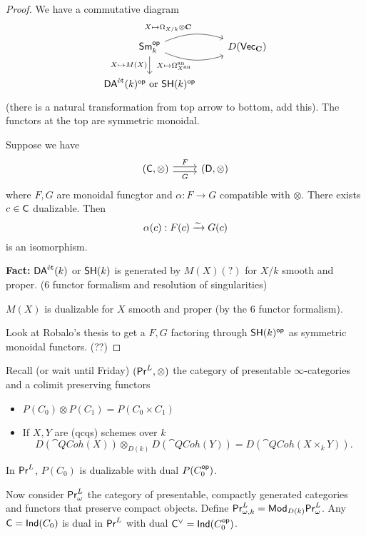 \begin{proof}
	We have a commutative diagram
	\[
		\begin{tikzcd}
			\cat{Sm}_k\op \ar[r, bend left=20, "X\mapsto \Omega_{X /k}\otimes\bb{C}", name=F]
			\ar[r, bend right=20, "X\mapsto \Omega_{X\an}\an"', name=G]
			\ar[d,"X\mapsto M(X)"']
			& D(\cat{Vec}_{\bb{C}})
			\\
			\DAet(k)\op\text{ or }\SH(k)\op
		\end{tikzcd}
	\]
	(there is a natural transformation from top arrow to bottom, add this). The functors at
	the top are symmetric monoidal.

	\begin{lemma}
		Suppose we have
		\begin{equation}
			\begin{tikzcd}
				(\C,\otimes) \ar[r,shift left,"F"] \ar[r,shift right,"G"'] & (\cat{D},\otimes)
			\end{tikzcd}
		\end{equation}
		where $F,G$ are monoidal funcgtor and $\alpha:F\to G$ compatible with $\otimes$. There
		exists $c\in \mathsf{C}$ dualizable. Then
		\[
			\alpha(c): F(c) \xrightarrow{\sim} G(c)
		\]
		is an isomorphism.
	\end{lemma}
	\textbf{Fact:} $\mathsf{DA}^\text{\'et}(k)$ or $\mathsf{SH}(k)$ is generated by $M(X)(?)$ for $X /k$ smooth and
	proper. (6 functor formalism and resolution of singularities)

	$M(X)$ is dualizable for $X$ smooth and proper (by the 6 functor formalism).

	Look at Robalo's thesis to get a $F,G$ factoring through $\mathsf{SH}(k)^\mathsf{op}$ as symmetric
	monoidal functors. (??)
\end{proof}
Recall (or wait until Friday) $(\mathsf{Pr}^L,\otimes)$ the category of presentable
$\infty$-categories and a colimit preserving functors
\begin{itemize}
	\item $P(C_0)\otimes P(C_1) = P(C_0\times C_1)$
	\item If $X,Y$ are (qcqs) schemes over $k$
		\[
			D(\cat{QCoh}(X)) \otimes_{D(k)}D(\cat{QCoh}(Y)) = D(\cat{QCoh}(X\times_k Y)).
		\]
\end{itemize}
\begin{example}
	In $\mathsf{Pr}^L$, $P(C_0)$ is dualizable with dual $P(C_0^\mathsf{op})$.
\end{example}

Now consider $\mathsf{Pr}^L_{\omega}$ the category of presentable, compactly generated categories
and functors that preserve compact objects. Define $\mathsf{Pr}^L_{\omega,k} =
\mathsf{Mod}_{D(k)}\mathsf{Pr}^L_\omega$. Any $\mathsf{C}=\mathsf{Ind}(C_0)$ is dual in $\mathsf{Pr}^L$ with dual
$\mathsf{C}^{\vee}=\mathsf{Ind}(C_0^\mathsf{op})$.


